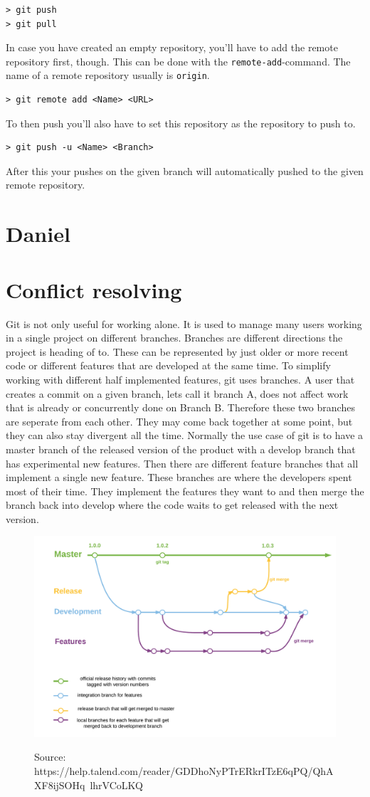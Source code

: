 \documentclass[a4paper, 12pt]{article}
\begin{document}
		\begin{lstlisting}
> git push
> git pull
		\end{lstlisting}
		
		In case you have created an empty repository, you'll have to add the remote repository first, though. This can be done with the \lstinline|remote-add|-command. The name of a remote repository usually is \lstinline|origin|.
		
		\begin{lstlisting}
> git remote add <Name> <URL>
		\end{lstlisting}
		
		To then push you'll also have to set this repository as the repository to push to.
		
		\begin{lstlisting}
> git push -u <Name> <Branch>
		\end{lstlisting}
		
		After this your pushes on the given branch will automatically pushed to the given remote repository.

	\section{Daniel}
			
	\section{Conflict resolving}
		
		Git is not only useful for working alone. It is used to manage many users working in a single project on different branches. Branches are different directions the project is heading of to. These can be represented by just older or more recent code or different features that are developed at the same time. To simplify working with different half implemented features, git uses branches. A user that creates a commit on a given branch, lets call it branch A, does not affect work that is already or concurrently done on Branch B. Therefore these two branches are seperate from each other. They may come back together at some point, but they can also stay divergent all the time. Normally the use case of git is to have a master branch of the released version of the product with a develop branch that has experimental new features. Then there are different feature branches that all implement a single new feature. These branches are where the developers spent most of their time. They implement the features they want to and then merge the branch back into develop where the code waits to get released with the next version.
		
		\begin{figure}[h]
			\centering
			\includegraphics[width=.725\linewidth]{gitbranches.png}
			\label{fig1}
			\caption{Source: https://help.talend.com/reader/GDDhoNyPTrERkrITzE6qPQ/QhAXF8ijSOHq~lhrVCoLKQ}
		\end{figure}
\end{document}
